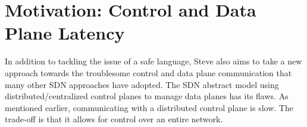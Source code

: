 %
%
%
%
%

\section{Motivation: Control and Data Plane Latency}

In addition to tackling the issue of a safe language, 
Steve also aims to take a new approach towards the troublesome
control and data plane communication that many other SDN
approaches have adopted.
The SDN abstract model using distributed/centralized control
planes to manage data planes has its flaws.
As mentioned earlier, communicating with a distributed control plane is slow.
The trade-off is that it allows for control over an
entire network.

